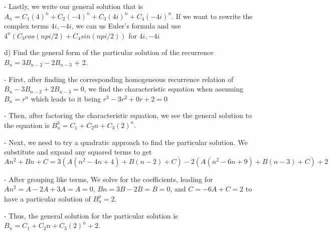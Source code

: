 \documentclass{article}
\begin{document}
\begin{problem}
\vspace{0.1in} - Lastly, we write our general solution that is $A_n=C_1(4)^n+C_2(-4)^n+C_3(4i)^n+C_4(-4i)^n$. If we want to rewrite the complex terms $4i,-4i$, we can us Euler's formula and use $4^n(C_3cos(npi/2)+C_4sin(npi/2))$ for $4i,-4i$ 

\vspace {0.1in}
\noindent  d) Find the general form of the particular solution of the recurrence $B_n = 3B_{n-2} - 2B_{n-3}$ + 2.

\vspace{0.1in} - First, after finding the corresponding homogeneous recurrence relation of $B_n-3B_{n-2}+2B_{n-3}=0$, we find the characteristic equation when assuming $B_n=r^n$ which leads to it being $r^3-3r^2+0r+2=0$

\vspace{0.1in} - Then, after factoring the characteristic equation, we see the general solution to the equation is $B^h_n=C_1+C_2n+C_3(2)^n$.

\vspace{0.1in} - Next, we need to try a quadratic approach to find the particular solution. We substitute and expand any squared terms to get $An^2+Bn+C=3(A(n^2-4n+4)+B(n-2)+C)-2(A(n^2-6n+9)+B(n-3)+C)+2$

\vspace{0.1in} - After grouping like terms, We solve for the coefficients, leading for $An^2=A-2A+3A=A=0$, $Bn=3B-2B=B=0$, and $C=-6A+C=2$ to have a particular solution of $B^p_n=2$.

\vspace{0.1in} - Thus, the general solution for the particular solution is $B_n=C_1+C_2n+C_3(2)^n+2$.

\end{problem}


\end{document}
